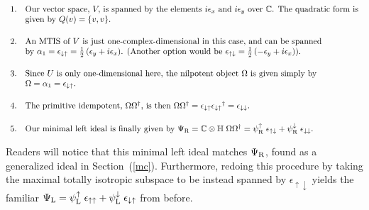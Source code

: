 \documentclass[letterpaper,12pt,titlepage,oneside,final]{book}
\newcommand{\CH}{\mathbb{C}\otimes\mathbb{H}}
\begin{document}
$$\begin{array}{ll} 
 1. &  \textup{Our vector space, $V,$ is spanned by the elements $i{\epsilon_x}$ and $i{\epsilon_y}$ over $\mathbb{C}$.  The quadratic form is} \\
& \vspace{.5cm} \textup{given by $Q(v) = \{v,v\}$.}
 \\
  2. & \textup{An MTIS of $V$ is just one-complex-dimensional in this case, and can be spanned}\\
 & \vspace{.5cm} \textup{by $\alpha_1 = \epsilon_{\downarrow\uparrow} = \frac{1}{2}\left({\epsilon_y} +i {\epsilon_x}\right)$.  (Another option would be $\epsilon_{\uparrow\downarrow}= \frac{1}{2}\left(-{\epsilon_y} +i {\epsilon_x}\right)$).} \\
 3. &  \textup{Since $U$ is only one-dimensional here, the nilpotent object $\Omega$ is given simply by} \\ 
 & \vspace{.5cm} \Omega =\alpha_1 =  \epsilon_{\downarrow\uparrow}. 
\\
 4. &  \vspace{.5cm} \textup{The primitive idempotent, $\Omega\Omega^{\dagger}$, is then  $\Omega\Omega^{\dagger} = \epsilon_{\downarrow\uparrow}{\epsilon_{\downarrow\uparrow}}^{\dagger} = \epsilon_{\downarrow\downarrow}$.}
\\5. & \textup{Our minimal left ideal is finally given by $\Psi_{\textup{R}}  = \CH \hspace{1mm}\Omega\Omega^{\dagger} = \psi^{\uparrow}_{\textup{R}} \hspace{1mm} \epsilon_{\uparrow \downarrow} +  \psi^{\downarrow}_{\textup{R}} \hspace{1mm} \epsilon_{\downarrow \downarrow} $.}
\end{array}$$
\medskip






\noindent  Readers will notice that this minimal left ideal matches $\Psi_{\textup{R}}$, found as a generalized ideal  in Section~(\ref{mc}).  Furthermore, redoing this procedure by taking the maximal totally isotropic subspace to be instead spanned by $\epsilon_{\uparrow\downarrow}$ yields the familiar $\Psi_{\textup{L}}  =  \psi^{\uparrow}_{\textup{L}} \hspace{1mm} \epsilon_{\uparrow \uparrow} +  \psi^{\downarrow}_{\textup{L}} \hspace{1mm} \epsilon_{\downarrow \uparrow}$ from before.
\end{document}

